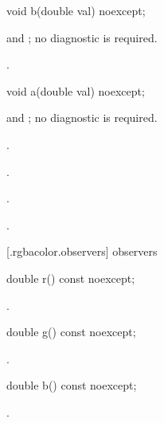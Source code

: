 %
%
\begin{itemdecl}
	void b(double val) noexcept;
\end{itemdecl}
\begin{itemdescr}
	\pnum
	\requires
	 and ; no diagnostic is required.
	
	\pnum
	\postconditions
	.
\end{itemdescr}

%
%
\begin{itemdecl}
	void a(double val) noexcept;
\end{itemdecl}
\begin{itemdescr}
	\pnum
	\requires
	 and ; no diagnostic is required.
	
	\pnum
	\postconditions
	.
	
	.
	
	.
	
	.
\end{itemdescr}

 [\iotwod.rgbacolor.observers]{ observers}

%
%
\begin{itemdecl}
	double r() const noexcept;
\end{itemdecl}
\begin{itemdescr}
	\pnum
	\returns
	.
\end{itemdescr}

%
%
\begin{itemdecl}
	double g() const noexcept;
\end{itemdecl}
\begin{itemdescr}
	\pnum
	\returns
	.
\end{itemdescr}

%
%
\begin{itemdecl}
	double b() const noexcept;
\end{itemdecl}
\begin{itemdescr}
	\pnum
	\returns
	.
\end{itemdescr}


